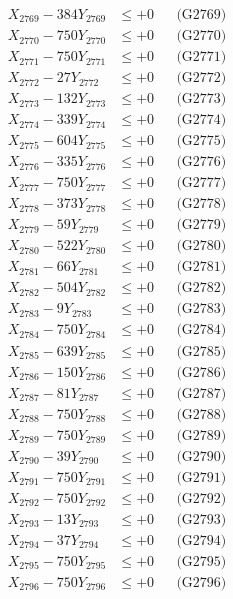 \documentclass[a4paper,10pt]{article}
\begin{document}
{\begin{align}
X_{2769} - 384Y_{2769} &\leq +0 && \text{(G2769)} \\
X_{2770} - 750Y_{2770} &\leq +0 && \text{(G2770)} \\
\allowbreak
X_{2771} - 750Y_{2771} &\leq +0 && \text{(G2771)} \\
X_{2772} - 27Y_{2772} &\leq +0 && \text{(G2772)} \\
X_{2773} - 132Y_{2773} &\leq +0 && \text{(G2773)} \\
X_{2774} - 339Y_{2774} &\leq +0 && \text{(G2774)} \\
X_{2775} - 604Y_{2775} &\leq +0 && \text{(G2775)} \\
X_{2776} - 335Y_{2776} &\leq +0 && \text{(G2776)} \\
X_{2777} - 750Y_{2777} &\leq +0 && \text{(G2777)} \\
X_{2778} - 373Y_{2778} &\leq +0 && \text{(G2778)} \\
X_{2779} - 59Y_{2779} &\leq +0 && \text{(G2779)} \\
X_{2780} - 522Y_{2780} &\leq +0 && \text{(G2780)} \\
\allowbreak
X_{2781} - 66Y_{2781} &\leq +0 && \text{(G2781)} \\
X_{2782} - 504Y_{2782} &\leq +0 && \text{(G2782)} \\
X_{2783} - 9Y_{2783} &\leq +0 && \text{(G2783)} \\
X_{2784} - 750Y_{2784} &\leq +0 && \text{(G2784)} \\
X_{2785} - 639Y_{2785} &\leq +0 && \text{(G2785)} \\
X_{2786} - 150Y_{2786} &\leq +0 && \text{(G2786)} \\
X_{2787} - 81Y_{2787} &\leq +0 && \text{(G2787)} \\
X_{2788} - 750Y_{2788} &\leq +0 && \text{(G2788)} \\
X_{2789} - 750Y_{2789} &\leq +0 && \text{(G2789)} \\
X_{2790} - 39Y_{2790} &\leq +0 && \text{(G2790)} \\
\allowbreak
X_{2791} - 750Y_{2791} &\leq +0 && \text{(G2791)} \\
X_{2792} - 750Y_{2792} &\leq +0 && \text{(G2792)} \\
X_{2793} - 13Y_{2793} &\leq +0 && \text{(G2793)} \\
X_{2794} - 37Y_{2794} &\leq +0 && \text{(G2794)} \\
X_{2795} - 750Y_{2795} &\leq +0 && \text{(G2795)} \\
X_{2796} - 750Y_{2796} &\leq +0 && \text{(G2796)} \\

\end{align}}
\end{document}
